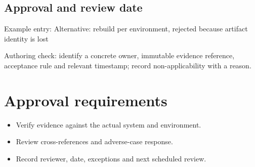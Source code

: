 \documentclass[10pt,letterpaper]{article}
\begin{document}
\subsection{Approval and review date}
Example entry: Alternative: rebuild per environment, rejected because artifact identity is lost

Authoring check: identify a concrete owner, immutable evidence reference, acceptance rule and relevant timestamp; record non-applicability with a reason.


\section{Approval requirements}
\begin{itemize}
\item Verify evidence against the actual system and environment.
\item Review cross-references and adverse-case response.
\item Record reviewer, date, exceptions and next scheduled review.
\end{itemize}
\end{document}
